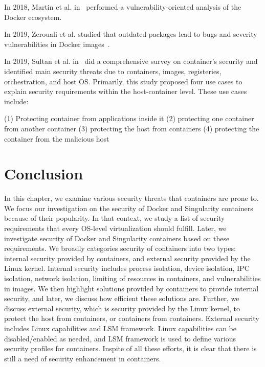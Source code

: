 In 2018, Martin et al. in~\cite{martin2018docker} performed a
vulnerability-oriented analysis of the Docker ecosystem.

In 2019, Zerouali et al. studied that
outdated packages lead to bugs and severity vulnerabilities in Docker
images~\cite{zerouali2019relation}.

In 2019, Sultan et al. in~\cite{sultan2019container} did a comprehensive
survey on container's security and identified main security threats
due to containers, images, registeries, orchestration, and host OS.
Primarily, this study proposed four use cases to explain security
requirements within the host-container level.
These use cases include: 

(1) Protecting container from applications inside it
(2) protecting one container from another container (3) protecting the host
from containers (4) protecting the container from the malicious host 

%
%


\section{Conclusion}

In this chapter, we examine various security threats that
containers are prone to. We focus our investigation on the
security of Docker and Singularity containers because of their popularity.
In that context, we study a list of security requirements that every OS-level
virtualization should fulfill. Later, we investigate security of Docker and Singularity
containers based on these requirements. We broadly categories security of
containers into two types: internal security provided by containers, and
external security provided by the Linux kernel.
Internal security includes process isolation, device isolation, IPC
isolation, network isolation, limiting of resources in containers, and
vulnerabilities in images.
We then highlight solutions
provided by containers to provide internal security, and later,
we discuss how efficient these solutions are.
Further, we discuss external security, which is security provided by
the Linux kernel, to protect the host from containers, or containers from
containers. External security includes Linux
capabilities and LSM framework. Linux capabilities can be
disabled/enabled as needed, and LSM framework is used
to define various security profiles for containers.
Inspite of all these efforts, it is clear that there is
still a need of security enhancement in containers.
